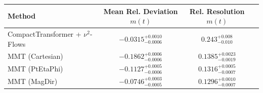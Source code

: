     \begin{tabular}{lccc}
        \toprule
        Method & Mean Rel. Deviation $m(t)$ & Rel. Resolution $m(t)$ \\
        \midrule
        CompactTransformer + $\nu^2$-Flows & $-0.0315^{+0.0010}_{-0.0006}$ & $0.243^{+0.008}_{-0.010}$ \\
        MMT (Cartesian) & $-0.1862^{+0.0006}_{-0.0006}$ & $0.1385^{+0.0023}_{-0.0019}$ \\
        MMT (PtEtaPhi) & $-0.1127^{+0.0005}_{-0.0006}$ & $0.1316^{+0.0005}_{-0.0007}$ \\
        MMT (MagDir) & $-0.0746^{+0.0003}_{-0.0005}$ & $0.1296^{+0.0010}_{-0.0007}$ \\
        \bottomrule
    \end{tabular}